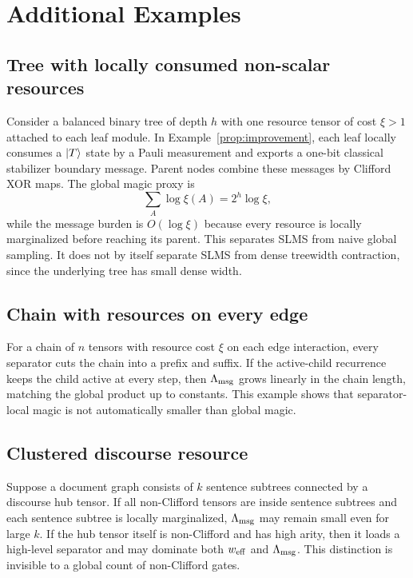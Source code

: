 \section{Additional Examples}
\label{app:examples}

\subsection{Tree with locally consumed non-scalar resources}

Consider a balanced binary tree of depth \(h\) with one resource tensor of cost \(\xi>1\) attached to each leaf module. In Example~\ref{prop:improvement}, each leaf locally consumes a \(\left|T\right\rangle\) state by a Pauli measurement and exports a one-bit classical stabilizer boundary message. Parent nodes combine these messages by Clifford XOR maps. The global magic proxy is
\[
\sum_A\log\xi(A)=2^h\log\xi,
\]
while the message burden is \(O(\log\xi)\) because every resource is locally marginalized before reaching its parent. This separates SLMS from naive global sampling. It does not by itself separate SLMS from dense treewidth contraction, since the underlying tree has small dense width.

\subsection{Chain with resources on every edge}

For a chain of \(n\) tensors with resource cost \(\xi\) on each edge interaction, every separator cuts the chain into a prefix and suffix. If the active-child recurrence keeps the child active at every step, then \(\Lambda_{\mathrm{msg}}\) grows linearly in the chain length, matching the global product up to constants. This example shows that separator-local magic is not automatically smaller than global magic.

\subsection{Clustered discourse resource}

Suppose a document graph consists of \(k\) sentence subtrees connected by a discourse hub tensor. If all non-Clifford tensors are inside sentence subtrees and each sentence subtree is locally marginalized, \(\Lambda_{\mathrm{msg}}\) may remain small even for large \(k\). If the hub tensor itself is non-Clifford and has high arity, then it loads a high-level separator and may dominate both \(w_{\mathrm{eff}}\) and \(\Lambda_{\mathrm{msg}}\). This distinction is invisible to a global count of non-Clifford gates.
